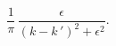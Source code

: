 \begin{equation}\label{delta+}
\frac{1}{\pi}\,\frac{\epsilon}{(k-k\,')^2+\epsilon^2}.
\end{equation}

